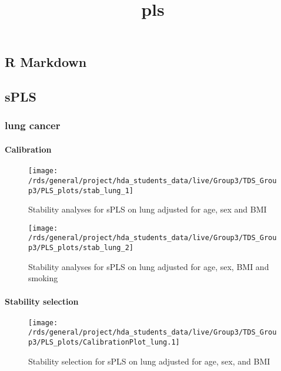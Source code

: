 \documentclass[
]{article}
\title{pls}
\author{}
\date{\vspace{-2.5em}}
\begin{document}
\maketitle

\hypertarget{r-markdown}{%
\subsection{R Markdown}\label{r-markdown}}

\hypertarget{spls}{%
\subsection{sPLS}\label{spls}}

\hypertarget{lung-cancer}{%
\subsubsection{lung cancer}\label{lung-cancer}}

\hypertarget{calibration}{%
\paragraph{Calibration}\label{calibration}}

\begin{figure}
\texttt{[image: /rds/general/project/hda\_students\_data/live/Group3/TDS\_Group3/PLS\_plots/stab\_lung\_1]} \caption{Stability analyses for sPLS on lung adjusted for age, sex and BMI}\label{fig:stability analyses on lung.1}
\end{figure}

\begin{figure}
\texttt{[image: /rds/general/project/hda\_students\_data/live/Group3/TDS\_Group3/PLS\_plots/stab\_lung\_2]} \caption{Stability analyses for sPLS on lung adjusted for age, sex, BMI and smoking}\label{fig:stability analyses on lung.2}
\end{figure}

\hypertarget{stability-selection}{%
\paragraph{Stability selection}\label{stability-selection}}

\begin{figure}
\texttt{[image: /rds/general/project/hda\_students\_data/live/Group3/TDS\_Group3/PLS\_plots/CalibrationPlot\_lung.1]} \caption{Stability selection for sPLS on lung adjusted for age, sex, and BMI}\label{fig:stability selection on lung.1}
\end{figure}
\end{document}
